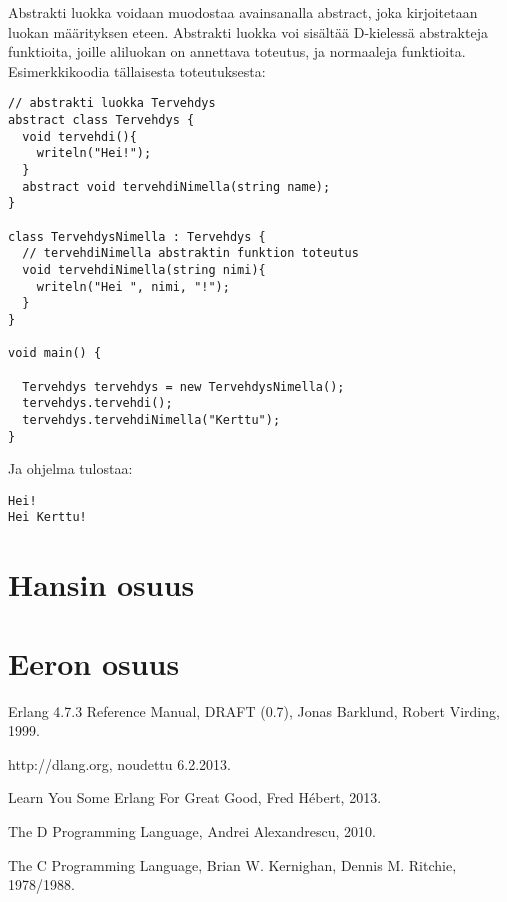 \documentclass[11pt,oneside,a4paper]{article}
\begin{document}
Abstrakti luokka voidaan muodostaa avainsanalla abstract, joka kirjoitetaan luokan määrityksen eteen. Abstrakti luokka voi sisältää D-kielessä abstrakteja funktioita, joille aliluokan on annettava toteutus, ja normaaleja funktioita. Esimerkkikoodia tällaisesta toteutuksesta:
\begin{verbatim}
// abstrakti luokka Tervehdys
abstract class Tervehdys { 
  void tervehdi(){ 
    writeln("Hei!"); 
  } 
  abstract void tervehdiNimella(string name); 
} 

class TervehdysNimella : Tervehdys { 
  // tervehdiNimella abstraktin funktion toteutus
  void tervehdiNimella(string nimi){ 
    writeln("Hei ", nimi, "!"); 
  } 
} 

void main() {

  Tervehdys tervehdys = new TervehdysNimella(); 
  tervehdys.tervehdi(); 
  tervehdys.tervehdiNimella("Kerttu"); 
}
\end{verbatim}
Ja ohjelma tulostaa:
\begin{verbatim}
Hei!
Hei Kerttu!
\end{verbatim}
\section{Hansin osuus}

\section{Eeron osuus}






\begin{thebibliography}{99}

 Erlang 4.7.3 Reference Manual, DRAFT (0.7), Jonas
Barklund, Robert Virding, 1999. 

 http://dlang.org, noudettu 6.2.2013.

 Learn You Some Erlang For Great Good, Fred Hébert, 2013.

 The D Programming Language, Andrei Alexandrescu, 2010.

 The C Programming Language, Brian W. Kernighan, Dennis M. Ritchie, 1978/1988.

\end{thebibliography}
\end{document}

